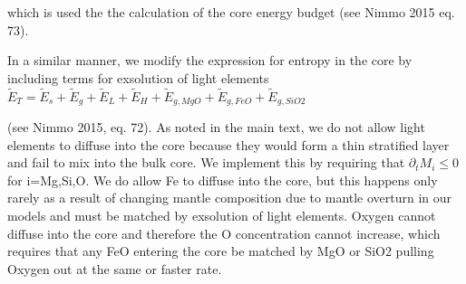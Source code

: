 \documentclass[]{article}
\begin{document}
which is used the the calculation of the core energy budget (see Nimmo
2015 eq. 73).

In a similar manner, we modify the expression for entropy in the core by
including terms for exsolution of light elements
\(\tilde{E}_T = \tilde{E}_s+\tilde{E}_g+\tilde{E}_L+\tilde{E}_H +\tilde{E}_{g,MgO}+\tilde{E}_{g,FeO}+\tilde{E}_{g,SiO2}\)

(see Nimmo 2015, eq. 72). As noted in the main text, we do not allow
light elements to diffuse into the core because they would form a thin
stratified layer and fail to mix into the bulk core. We implement this
by requiring that \(\partial_t M_i \le 0\) for i=Mg,Si,O. We do allow
Fe to diffuse into the core, but this happens only rarely as a result of
changing mantle composition due to mantle overturn in our models and
must be matched by exsolution of light elements. Oxygen cannot diffuse
into the core and therefore the O concentration cannot increase, which
requires that any FeO entering the core be matched by MgO or SiO2
pulling Oxygen out at the same or faster rate.
\end{document}
